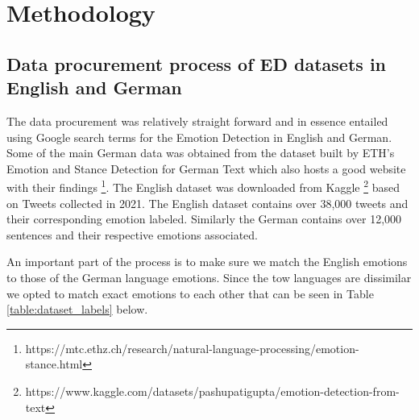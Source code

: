 \documentclass[11pt]{article}
\begin{document}
\clearpage
\section{Methodology}

\subsection{Data procurement process of ED datasets in English and German}
\label{sec:data-procurement-process}
The data procurement was relatively straight forward and in essence entailed using Google search terms for the Emotion Detection in English and German. Some of the main German data was obtained from the dataset built by ETH's Emotion and Stance Detection for German Text \cite{mascarell-etal-2021-stance} which also hosts a good website with their findings \footnote{https://mtc.ethz.ch/research/natural-language-processing/emotion-stance.html}. The English dataset was downloaded from Kaggle \footnote{https://www.kaggle.com/datasets/pashupatigupta/emotion-detection-from-text} based on Tweets collected in 2021. The English dataset contains over 38,000 tweets and their corresponding emotion labeled. Similarly the German contains over 12,000 sentences and their respective emotions associated.

An important part of the process is to make sure we match the English emotions to those of the German language emotions. Since the tow languages are dissimilar we opted to match exact emotions to each other that can be seen in Table \ref{table:dataset_labels} below.
\end{document}
